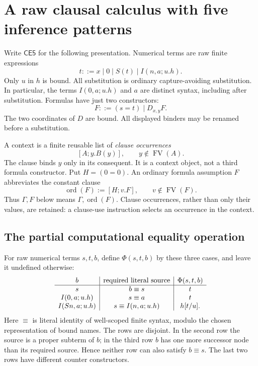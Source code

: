 
\section{A raw clausal calculus with five inference patterns}
\label{sec:ce5-specification}

Write $\mathsf{CE5}$ for the following presentation. Numerical terms are
raw finite expressions
\[
 t ::= x\mid 0\mid S(t)\mid I(n,a;u.h).
\]
Only $u$ in $h$ is bound. All substitution is ordinary capture-avoiding
substitution. In particular, the terms $I(0,a;u.h)$ and $a$ are distinct
syntax, including after substitution. Formulas have just two constructors:
\[
 F::=(s=t)\mid D_{x,y}F.
\]
The two coordinates of $D$ are bound. All displayed binders may be
renamed before a substitution.

A context is a finite reusable list of \emph{clause occurrences}
\[
 [A;y.B(y)],\qquad y\notin\operatorname{FV}(A).
\]
The clause binds $y$ only in its consequent. It is a context object,
not a third formula constructor. Put $H=(0=0)$. An ordinary formula
assumption $F$ abbreviates the constant clause
\[
 \operatorname{ord}(F):=[H;v.F],
 \qquad v\notin\operatorname{FV}(F).
\]
Thus $\Gamma,F$ below means $\Gamma,\operatorname{ord}(F)$.
Clause occurrences, rather than only their values, are retained: a
clause-use instruction selects an occurrence in the context.

\subsection{The partial computational equality operation}

For raw numerical terms $s,t,b$, define $\Phi(s,t,b)$ by these three
cases, and leave it undefined otherwise:
\[
\begin{array}{c|c|c}
 b&\hbox{required literal source}&\Phi(s,t,b)\\ \hline
 s&b\equiv s&t\\
 I(0,a;u.h)&s\equiv a&t\\
 I(Sn,a;u.h)&s\equiv I(n,a;u.h)&h[t/u].
\end{array}
\]
Here $\equiv$ is literal identity of well-scoped finite syntax, modulo
the chosen representation of bound names. The rows are disjoint. In the
second row the source is a proper subterm of $b$; in the third row $b$
has one more successor node than its required source. Hence neither row
can also satisfy $b\equiv s$. The last two rows have different counter
constructors.


